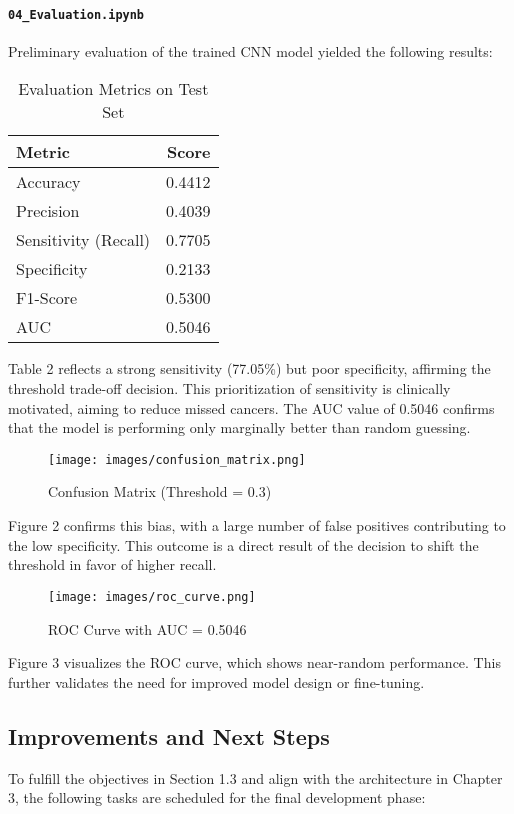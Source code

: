 \documentclass[12pt]{article}
\begin{document}
\paragraph{\texttt{04\_Evaluation.ipynb}}
Preliminary evaluation of the trained CNN model yielded the following results:

\begin{table}[H]
\centering
\caption{Evaluation Metrics on Test Set}
\begin{tabular}{lr}
\toprule
Metric & Score \\
\midrule
Accuracy & 0.4412 \\
Precision & 0.4039 \\
Sensitivity (Recall) & 0.7705 \\
Specificity & 0.2133 \\
F1-Score & 0.5300 \\
AUC & 0.5046 \\
\bottomrule
\end{tabular}
\end{table}

Table 2 reflects a strong sensitivity (77.05\%) but poor specificity, affirming the threshold trade-off decision. This prioritization of sensitivity is clinically motivated, aiming to reduce missed cancers. The AUC value of 0.5046 confirms that the model is performing only marginally better than random guessing.

\begin{figure}[H]
\centering
\texttt{[image: images/confusion\_matrix.png]}
\caption{Confusion Matrix (Threshold = 0.3)}
\end{figure}
Figure 2 confirms this bias, with a large number of false positives contributing to the low specificity. This outcome is a direct result of the decision to shift the threshold in favor of higher recall.

\begin{figure}[H]
\centering
\texttt{[image: images/roc\_curve.png]}
\caption{ROC Curve with AUC = 0.5046}
\end{figure}
Figure 3 visualizes the ROC curve, which shows near-random performance. This further validates the need for improved model design or fine-tuning.

\subsection{Improvements and Next Steps}
\label{improvements}
To fulfill the objectives in Section 1.3 and align with the architecture in Chapter 3, the following tasks are scheduled for the final development phase:
\end{document}
